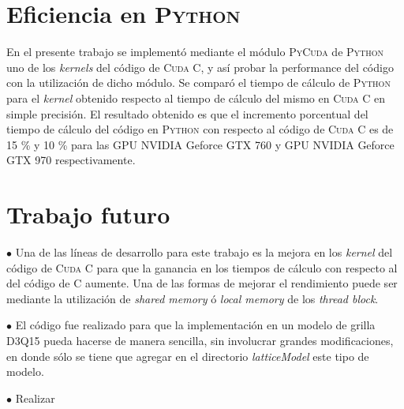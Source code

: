 \section{Eficiencia en \textsc{Python}}

En el presente trabajo se implementó mediante el módulo \textsc{PyCuda} de \textsc{Python} uno de los \textit{kernels} del código de \textsc{Cuda C}, y así probar la performance del código con la utilización de dicho módulo. Se comparó el tiempo de cálculo de \textsc{Python} para el \textit{kernel} obtenido respecto al tiempo de cálculo del mismo en \textsc{Cuda C} en simple precisión. El resultado obtenido es que el incremento porcentual del tiempo de cálculo del código en \textsc{Python} con respecto al código de \textsc{Cuda C} es de 15 \% y 10 \% para las GPU NVIDIA Geforce GTX 760 y GPU NVIDIA Geforce GTX 970 respectivamente.

\section{Trabajo futuro}

$\bullet$ Una de las líneas de desarrollo para este trabajo es la mejora en los \textit{kernel} del código de \textsc{Cuda C} para que la ganancia en los tiempos de cálculo con respecto al del código de \textsc{C} aumente. Una de las formas de mejorar el rendimiento puede ser mediante la utilización de \textit{shared memory} ó \textit{local memory} de los \textit{thread block}. 

$\bullet$ El código fue realizado para que la implementación en un modelo de grilla D3Q15 pueda hacerse de manera sencilla, sin involucrar grandes modificaciones, en donde sólo se tiene que agregar en el directorio \textit{latticeModel} este tipo de modelo. 

$\bullet$ Realizar 

%
%



